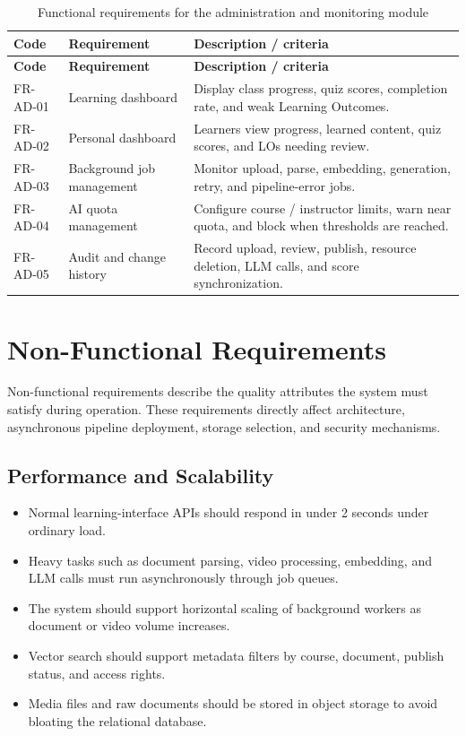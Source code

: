 \begin{longtable}{|p{2.4cm}|p{5.1cm}|p{6.9cm}|}
\caption{Functional requirements for the administration and monitoring module}
\label{tab:fr-quan-tri-theo-doi}\\
\hline
\textbf{Code} & \textbf{Requirement} & \textbf{Description / criteria} \\
\hline
\endfirsthead
\hline
\textbf{Code} & \textbf{Requirement} & \textbf{Description / criteria} \\
\hline
\endhead
FR-AD-01 & Learning dashboard & Display class progress, quiz scores, completion rate, and weak Learning Outcomes. \\
\hline
FR-AD-02 & Personal dashboard & Learners view progress, learned content, quiz scores, and LOs needing review. \\
\hline
FR-AD-03 & Background job management & Monitor upload, parse, embedding, generation, retry, and pipeline-error jobs. \\
\hline
FR-AD-04 & AI quota management & Configure course / instructor limits, warn near quota, and block when thresholds are reached. \\
\hline
FR-AD-05 & Audit and change history & Record upload, review, publish, resource deletion, LLM calls, and score synchronization. \\
\hline
\end{longtable}

\section{Non-Functional Requirements}
\label{sec:yeu-cau-phi-chuc-nang}

Non-functional requirements describe the quality attributes the system must
satisfy during operation. These requirements directly affect architecture,
asynchronous pipeline deployment, storage selection, and security mechanisms.

\subsection{Performance and Scalability}
\label{subsec:hieu-nang-kha-nang-mo-rong}

\begin{itemize}
    \item Normal learning-interface APIs should respond in under 2 seconds
          under ordinary load.
    \item Heavy tasks such as document parsing, video processing, embedding,
          and LLM calls must run asynchronously through job queues.
    \item The system should support horizontal scaling of background workers as
          document or video volume increases.
    \item Vector search should support metadata filters by course, document,
          publish status, and access rights.
    \item Media files and raw documents should be stored in object storage to
          avoid bloating the relational database.
\end{itemize}

